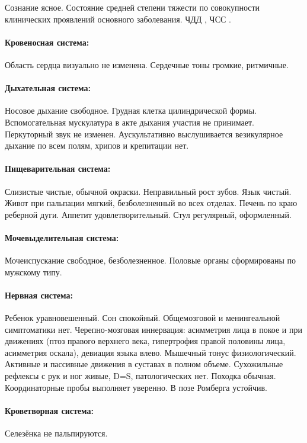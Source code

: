 \documentclass[a4paper,14pt]{extarticle}
\newcommand{\bpm}{уд/мин}
\newcommand{\mpm}{/мин}
\begin{document}
Сознание ясное.
Состояние средней степени тяжести по совокупности клинических проявлений основного заболевания.
ЧДД \numprint[\mpm]{26}, ЧСС \numprint[\bpm]{82}.

\paragraph{Кровеносная система:} Область сердца визуально не изменена. Сердечные тоны громкие, ритмичные. 

\paragraph{Дыхательная система:} Носовое дыхание свободное. Грудная клетка цилиндрической формы. Вспомогательная мускулатура в акте дыхания участия не принимает. Перкуторный звук не изменен. Аускультативно выслушивается везикулярное дыхание по всем полям, хрипов и крепитации нет.

\paragraph{Пищеварительная система:} Слизистые чистые, обычной окраски. Неправильный рост зубов. Язык чистый. Живот при пальпации мягкий, безболезненный во всех отделах. Печень по краю реберной дуги. Аппетит удовлетворительный. Стул регулярный, оформленный.

\paragraph{Мочевыделительная система:} Мочеиспускание свободное, безболезненное. Половые органы сформированы по мужскому типу.

\paragraph{Нервная система:} Ребенок уравновешенный. Сон спокойный. Общемозговой и менингеальной симптоматики нет. Черепно\hyp{}мозговая иннервация: асимметрия лица в покое и при движениях (птоз правого верхнего века, гипертрофия правой половины лица, асимметрия оскала), девиация языка влево. Мышечный тонус физиологический. Активные и пассивные движения в суставах в полном объеме. Сухожильные рефлексы с рук и ног живые, D=S, патологических нет. Походка обычная. Координаторные пробы выполняет уверенно. В позе Ромберга устойчив. 

\paragraph{Кроветворная система:} Селезёнка не пальпируются.
\end{document}
